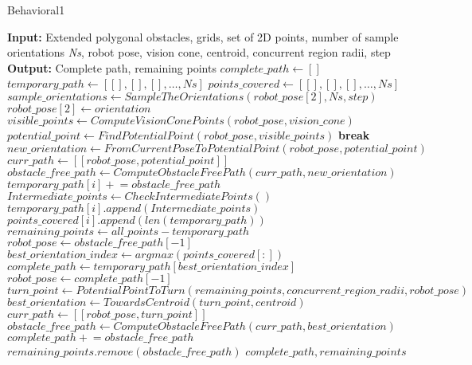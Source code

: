 \begin{algorithm}[H]
    \caption{Behavioral1}
    \begin{algorithmic}[1]
        \Statex \textbf{Input:} Extended polygonal obstacles, grids, set of 2D points, number of sample orientations \textit{Ns}, robot pose, vision cone, centroid, concurrent region radii, step
        \Statex \textbf{Output:} Complete path, remaining points
        \newline
        \State $complete\_path \gets []$
        \State $temporary\_path \gets [[], [], [], \ldots, Ns]$
        \State $points\_covered \gets [[], [], [], \ldots, Ns]$
        \State $sample\_orientations \gets SampleTheOrientations(robot\_pose[2], Ns, step)$
            \State $robot\_pose[2] \gets orientation$
                \State $visible\_points \gets ComputeVisionConePoints(robot\_pose, vision\_cone)$
                \State $potential\_point \gets FindPotentialPoint(robot\_pose, visible\_points)$
                    \State \textbf{break}
                \EndIf
                \State $new\_orientation \gets FromCurrentPoseToPotentialPoint(robot\_pose, potential\_point)$
                \State $curr\_path \gets [[robot\_pose, potential\_point]]$
                \State $obstacle\_free\_path \gets ComputeObstacleFreePath(curr\_path, new\_orientation)$
                \State $temporary\_path[i] \mathrel{+}= obstacle\_free\_path$
                \State $Intermediate\_points \gets CheckIntermediatePoints()$
                \State $temporary\_path[i].append(Intermediate\_points)$
                \State $points\_covered[i].append(len(temporary\_path))$
                \State $remaining\_points \gets all\_points - temporary\_path$
                \State $robot\_pose \gets obstacle\_free\_path[-1]$
            \EndWhile
        \EndFor
        \State $best\_orientation\_index \gets argmax(points\_covered[:])$
        \State $complete\_path \gets temporary\_path[best\_orientation\_index]$
        \State $robot\_pose \gets complete\_path[-1]$
        \State $turn\_point \gets PotentialPointToTurn(remaining\_points, concurrent\_region\_radii, robot\_pose)$
        \State $best\_orientation \gets TowardsCentroid(turn\_point, centroid)$
        \State $curr\_path \gets [[robot\_pose, turn\_point]]$
        \State $obstacle\_free\_path \gets ComputeObstacleFreePath(curr\_path, best\_orientation)$
        \State $complete\_path \mathrel{+}= obstacle\_free\_path$
        \State $remaining\_points.remove(obstacle\_free\_path)$
        \State \Return $complete\_path, remaining\_points$
    \end{algorithmic}
\end{algorithm}


